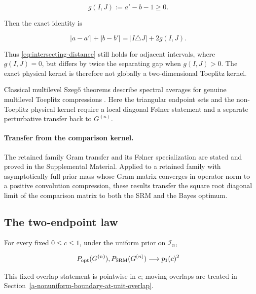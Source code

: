 \[
g(I,J):=a'-b-1\ge0.
\]

Then the exact identity is

\begin{equation}\label{eq:disjoint-distance}
|a-a'|+|b-b'|=|I\triangle J|+2g(I,J).
\end{equation}

Thus \eqref{eq:intersecting-distance} still holds for adjacent intervals,
where \(g(I,J)=0\), but differs by twice the separating gap when
\(g(I,J)>0\). The exact physical kernel is therefore not globally a
two-dimensional Toeplitz kernel.

Classical multilevel Szeg{\H o} theorems describe spectral averages for genuine
multilevel Toeplitz compressions \cite{tilli1998,tyrtyshnikov1998}. Here the
triangular endpoint sets and the non-Toeplitz physical kernel require a local
diagonal Følner statement and a separate perturbative transfer back to
\(G^{(n)}\).

\paragraph{Transfer from the comparison kernel.}
The retained family Gram transfer and its Følner specialization are stated and
proved in the Supplemental Material. Applied to a retained family with
asymptotically full prior mass whose Gram matrix converges in operator norm to
a positive convolution compression, these results transfer the square root
diagonal limit of the comparison matrix to both the SRM and the Bayes optimum.

\subsection{The two-endpoint law}\label{the-two-endpoint-law}

\begin{theorem}\label{thm:unknown-length}
For every fixed \(0\le c\le1\), under the uniform prior on \(\mathcal I_n\),

\begin{equation}\label{eq:unknown-length-limit}
P_{\rm opt}(G^{(n)}),P_{\rm SRM}(G^{(n)})
\longrightarrow p_1(c)^2
\end{equation}

This fixed overlap statement is pointwise in \(c\); moving overlaps are treated
in Section~\ref{a-nonuniform-boundary-at-unit-overlap}.
\end{theorem}

